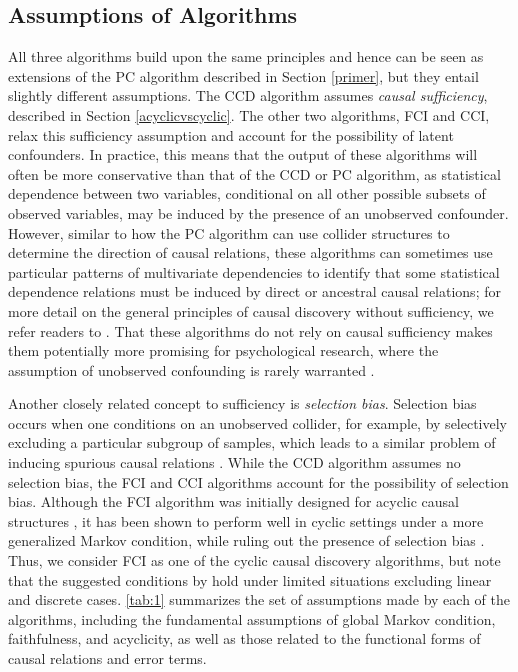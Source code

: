 \documentclass[twoside, 11pt]{article}
\begin{document}
\subsection{Assumptions of Algorithms} \label{assumptions}
All three algorithms build upon the same principles and hence can be seen as extensions of the PC algorithm described in Section \ref{primer}, but they entail slightly different assumptions. The CCD algorithm assumes \textit{causal sufficiency}, described in Section \ref{acyclicvscyclic}.
The other two algorithms, FCI and CCI, relax this sufficiency assumption and account for the possibility of latent confounders. In practice, this means that the output of these algorithms will often be more conservative than that of the CCD or PC algorithm, as statistical dependence between two variables, conditional on all other possible subsets of observed variables, may be induced by the presence of an unobserved confounder. However, similar to how the PC algorithm can use collider structures to determine the direction of causal relations, these algorithms can sometimes use particular patterns of multivariate dependencies to identify that some statistical dependence relations must be induced by direct or ancestral causal relations; for more detail on the general principles of causal discovery without sufficiency, we refer readers to \cite{spirtes2000}. That these algorithms do not rely on causal sufficiency makes them potentially more promising for psychological research, where the assumption of unobserved confounding is rarely warranted \citep{rohrer_thinking_2018}. 


Another closely related concept to sufficiency is \textit{selection bias}. Selection bias occurs when one conditions on an unobserved collider, for example, by selectively excluding a particular subgroup of samples, which leads to a similar problem of inducing spurious causal relations \citep{versteeg_local_2022, haslbeck_sum_2022}. While the CCD algorithm assumes no selection bias, the FCI and CCI algorithms account for the possibility of selection bias. Although the FCI algorithm was initially designed for acyclic causal structures \citep{spirtes_causal_1995}, it has been shown to perform well in cyclic settings under a more generalized Markov condition, while ruling out the presence of selection bias \citep{mooij_classen2020}. Thus, we consider FCI as one of the cyclic causal discovery algorithms, but note that the suggested conditions by \cite{mooij_classen2020} hold under limited situations excluding linear and discrete cases. \autoref{tab:1} summarizes the set of assumptions made by each of the algorithms, including the fundamental assumptions of global Markov condition, faithfulness, and acyclicity, as well as those related to the functional forms of causal relations and error terms.
\end{document}
